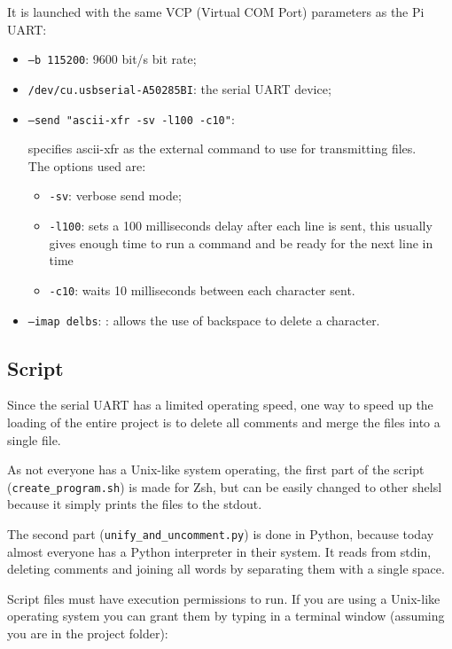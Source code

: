 \documentclass[a4paper, 12pt]{article}
\begin{document}
It is launched with the same VCP (Virtual COM Port) parameters as the Pi UART:
\begin{itemize}
    \item \texttt{--b 115200}: 9600 bit/s bit rate;
    \item \texttt{/dev/cu.usbserial-A50285BI}: the serial UART device;
    \item \texttt{--send "ascii-xfr -sv -l100 -c10"}:
    
    specifies ascii-xfr as the external
    command to use for transmitting files. \\
    The options used are: 
    \begin{itemize}
        \item \texttt{-sv}: verbose send mode;
        \item \texttt{-l100}: sets a 100 milliseconds delay after each line is sent,
        this usually gives enough time to run a command and be
        ready for the next line in time
        \item \texttt{-c10}: waits 10 milliseconds between each character sent.
    \end{itemize}
    \item \texttt{--imap delbs}: : allows the use of backspace to delete a character.
\end{itemize}

\subsection{Script}
Since the serial UART has a limited operating speed, one way to speed up the loading of the entire project is to delete all comments and merge the files into a single file.

As not everyone has a Unix-like system operating, the first part of the script (\texttt{create\_program.sh}) is made for Zsh, but can be easily changed to other shelsl because it simply prints the files to the stdout. 



The second part (\texttt{unify\_and\_uncomment.py}) is done in Python, because today almost everyone has a Python interpreter in their system. It reads from stdin, deleting comments and joining all words by separating them with a single space.



Script files must have execution permissions to run. If you are using a Unix-like operating system you can grant them by typing in a terminal window (assuming you are in the project folder):
\end{document}
